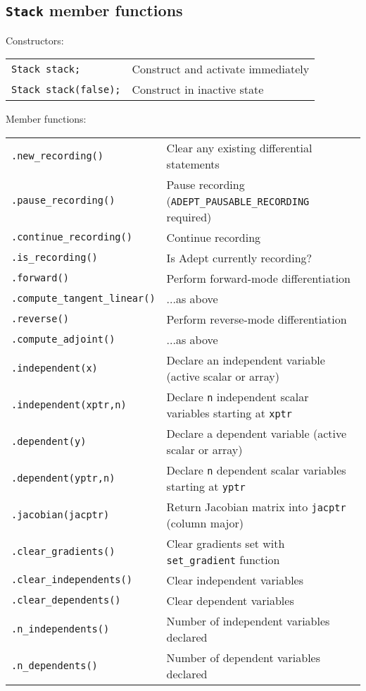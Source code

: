 \documentclass[10pt,a4,landscape]{article}
\def\code#1{\texttt{#1}}
\begin{document}
\subsection*{\code{Stack} member functions}
Constructors:\\
\begin{tabular}{ll}
\code{Stack stack;} & Construct and activate immediately \\
\code{Stack stack(false);} & Construct in inactive state\\
\end{tabular}
Member functions:\\
\begin{tabular}{ll}
\code{.new\_recording()} & Clear any existing differential statements\\
\code{.pause\_recording()} & Pause recording (\code{ADEPT\_PAUSABLE\_RECORDING} required)\\
\code{.continue\_recording()} & Continue recording \\
\code{.is\_recording()} & Is Adept currently recording?\\
\code{.forward()} & Perform forward-mode differentiation\\
\code{.compute\_tangent\_linear()} & ...as above\\
\code{.reverse()} & Perform reverse-mode differentiation\\
\code{.compute\_adjoint()} & ...as above\\
\code{.independent(x)} & Declare an independent variable (active scalar or array)\\
\code{.independent(xptr,n)} & Declare \code{n} independent scalar variables starting at \code{xptr} \\
\code{.dependent(y)} & Declare a dependent variable (active scalar or array)\\
\code{.dependent(yptr,n)} & Declare \code{n} dependent scalar variables starting at \code{yptr}\\
\code{.jacobian(jacptr)} & Return Jacobian matrix into \code{jacptr} (column major)\\
\code{.clear\_gradients()} & Clear gradients set with \code{set\_gradient} function \\
\code{.clear\_independents()} & Clear independent variables\\
\code{.clear\_dependents()} & Clear dependent variables\\
\code{.n\_independents()} & Number of independent variables declared \\
\code{.n\_dependents()} & Number of dependent variables declared\\
\end{tabular}
\end{document}
